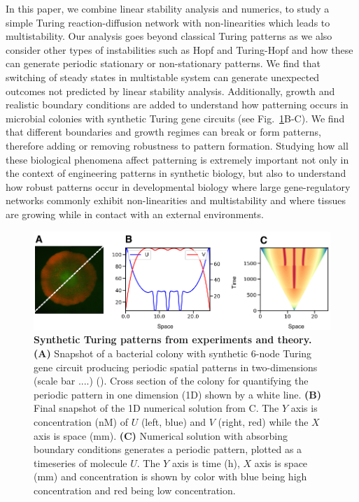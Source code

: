 In this paper, we combine linear stability analysis and numerics, to study a simple Turing  reaction-diffusion network with non-linearities which leads to multistability.
Our analysis goes beyond classical Turing patterns as we also consider other types of instabilities such as Hopf and Turing-Hopf and how these can generate periodic stationary or non-stationary patterns.
We find that switching of steady states in multistable system can generate unexpected outcomes not predicted by linear stability analysis.
Additionally, growth and realistic boundary conditions are added to understand how patterning occurs in microbial colonies with synthetic Turing gene circuits (see Fig.~\ref{fig1}B-C).
We find that different boundaries and growth regimes can break or form patterns, therefore adding or removing robustness to pattern formation.
Studying how all these biological phenomena affect patterning is extremely important not only in the context of engineering patterns in synthetic biology, but also to understand how robust patterns occur in developmental biology where large gene-regulatory networks commonly exhibit non-linearities and multistability and where tissues are growing while in contact with an external environments.


\begin{figure}[H]
    \includegraphics[width=1\textwidth]{figures/biological_example}

    \caption{{\bf Synthetic Turing patterns from experiments and theory.}
        \textbf{(A)} Snapshot of a bacterial colony with synthetic 6-node Turing gene circuit producing periodic spatial patterns in two-dimensions (scale bar ....) (\cite{Oliver2023}). Cross section of the colony for quantifying the periodic pattern in one dimension (1D) shown by a white line. \textbf{(B)} Final snapshot of the 1D numerical solution from C. The $Y$ axis is concentration (nM) of $U$ (left, blue) and $V$ (right, red) while the $X$ axis is space (mm). \textbf{(C)} Numerical solution with absorbing boundary conditions generates a periodic pattern, plotted as a timeseries of molecule $U$. The $Y$ axis is time (h), $X$ axis is space (mm) and concentration is shown by color with blue being high concentration and red being low concentration. }
    \label{fig1}
\end{figure}
 